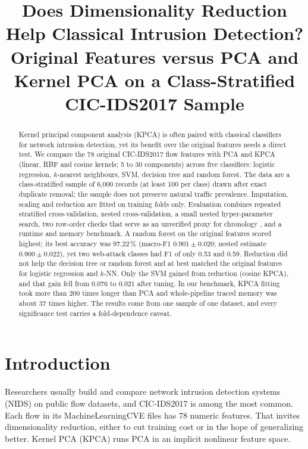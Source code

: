 \documentclass[runningheads]{llncs}
\begin{document}
\title{Does Dimensionality Reduction Help Classical Intrusion Detection? Original Features versus PCA and Kernel PCA on a Class-Stratified CIC-IDS2017 Sample}
\titlerunning{~}
\ifdefined\BLIND
\author{}
\authorrunning{~}
\institute{}
\else
\author{}
\authorrunning{~}
\institute{}
\fi
\maketitle
\begin{abstract}
Kernel principal component analysis (KPCA) is often paired with classical classifiers for network intrusion detection, yet its benefit over the original features needs a direct test. We compare the 78 original CIC-IDS2017 flow features with PCA and KPCA (linear, RBF and cosine kernels; 5 to 30 components) across five classifiers: logistic regression, $k$-nearest neighbours, SVM, decision tree and random forest. The data are a class-stratified sample of 6,000 records (at least 100 per class) drawn after exact duplicate removal; the sample does not preserve natural traffic prevalence. Imputation, scaling and reduction are fitted on training folds only. Evaluation combines repeated stratified cross-validation, nested cross-validation, a small nested hyper-parameter search, two row-order checks that serve as an unverified proxy for chronology , and a runtime and memory benchmark. A random forest on the original features scored highest; its best accuracy was 97.22\,\% (macro-F1 $0.901\pm0.020$; nested estimate $0.900\pm0.022$), yet two web-attack classes had F1 of only 0.53 and 0.59. Reduction did not help the decision tree or random forest and at best matched the original features for logistic regression and $k$-NN. Only the SVM gained from reduction (cosine KPCA), and that gain fell from 0.076 to 0.021 after tuning. In our benchmark, KPCA fitting took more than 200 times longer than PCA and whole-pipeline traced memory was about 37 times higher. The results come from one sample of one dataset, and every significance test carries a fold-dependence caveat.

\end{abstract}

\section{Introduction}
Researchers usually build and compare network intrusion detection systems (NIDS) on public flow datasets, and CIC-IDS2017 is among the most common. Each flow in its MachineLearningCVE files has 78 numeric features. That invites dimensionality reduction, either to cut training cost or in the hope of generalizing better. Kernel PCA (KPCA) runs PCA in an implicit nonlinear feature space.
\end{document}
